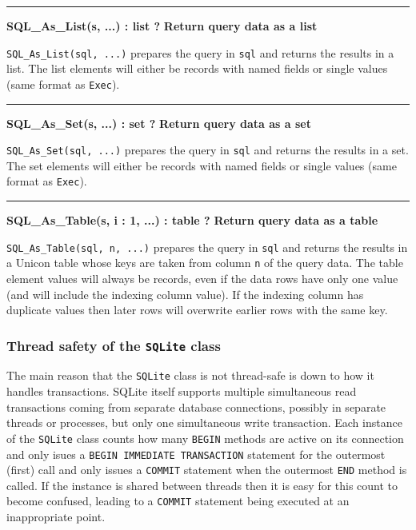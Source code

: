 \bigskip\hrule\vspace{0.1cm}
\noindent
{\bf SQL\_As\_List(s, ...) : list ? } \hfill {\bf Return query data as a list}

\noindent
\texttt{SQL\_As\_List(sql, ...)}  prepares the query in \texttt{sql} and returns
the results in a list. The list elements will either be records with named
fields or single values (same format as \texttt{Exec}).

\bigskip\hrule\vspace{0.1cm}
\noindent
{\bf SQL\_As\_Set(s, ...) : set ? } \hfill {\bf Return query data as a set}

\noindent
\texttt{SQL\_As\_Set(sql, ...)}  prepares the query in \texttt{sql} and returns
the results in a set. The set elements will either be records with named
fields or single values (same format as \texttt{Exec}).

\bigskip\hrule\vspace{0.1cm}
\noindent
{\bf SQL\_As\_Table(s, i : 1, ...) : table ? } \hfill {\bf Return query data as a table}

\noindent
\texttt{SQL\_As\_Table(sql, n, ...)}  prepares the query in \texttt{sql} and
returns the results in a Unicon table whose keys are taken from column \texttt{n} of
the query data. The table element values will always be records, even if the
data rows have only one value (and will include the indexing column value). If
the indexing column has duplicate values then later rows will overwrite earlier
rows with the same key.

\subsubsection{Thread safety of the \texttt{SQLite} class}
\label{SQLite_ThreadSafety}
The main reason that the \texttt{SQLite} class is not thread-safe is down to how
\WarningNotThreadSafe it handles transactions. SQLite itself supports multiple
simultaneous read transactions coming from separate database connections,
possibly in separate threads or processes, but only one simultaneous write
transaction. Each instance of the \texttt{SQLite} class counts how many
\texttt{BEGIN} methods are active on its connection and only isues a
\texttt{BEGIN IMMEDIATE TRANSACTION} statement for the outermost (first) call
and only issues a \texttt{COMMIT} statement when the outermost \texttt{END}
method is called.  If the instance is shared between threads then it is easy for
this count to become confused, leading to a \texttt{COMMIT} statement being
executed at an inappropriate point.

